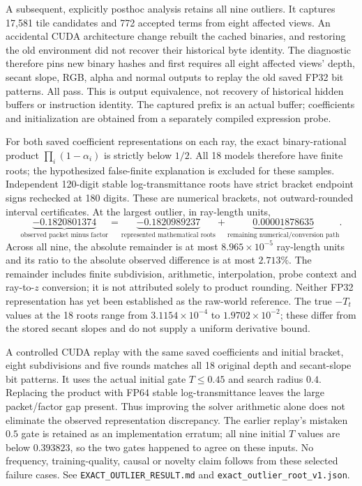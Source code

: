 \documentclass[11pt,a4paper]{article}
\begin{document}
A subsequent, explicitly posthoc analysis retains all nine outliers.
It captures 17,581 tile candidates and 772 accepted terms from eight
affected views. An accidental CUDA architecture change rebuilt the
cached binaries, and restoring the old environment did not recover
their historical byte identity. The diagnostic therefore pins new
binary hashes and first requires all eight affected views' depth,
secant slope, RGB, alpha and normal outputs to replay the old saved
FP32 bit patterns. All pass. This is output equivalence, not recovery
of historical hidden buffers or instruction identity. The captured
prefix is an actual buffer; coefficients and initialization are
obtained from a separately compiled expression probe.

For both saved coefficient representations on each ray, the exact
binary-rational product $\prod_i(1-\alpha_i)$ is strictly below
$1/2$. All 18 models therefore have finite roots; the hypothesized
false-finite explanation is excluded for these samples. Independent
120-digit stable log-transmittance roots have strict bracket endpoint
signs rechecked at 180 digits. These are numerical brackets, not
outward-rounded interval certificates. At the largest outlier, in
ray-length units,
\[
 \underbrace{-0.1820801374}_{\text{observed packet minus factor}}
 =\underbrace{-0.1820989237}_{\text{represented mathematical roots}}
  +\underbrace{0.00001878635}_{\text{remaining numerical/conversion path}}.
\]
Across all nine, the absolute remainder is at most
$8.965\times10^{-5}$ ray-length units and its ratio to the absolute
observed difference is at most $2.713\%$. The remainder includes
finite subdivision, arithmetic, interpolation, probe context and
ray-to-$z$ conversion; it is not attributed solely to product rounding.
Neither FP32 representation has yet been established as the raw-world
reference. The true $-T_t$ values at the 18 roots range from
$3.1154\times10^{-4}$ to $1.9702\times10^{-2}$; these differ from
the stored secant slopes and do not supply a uniform derivative bound.

A controlled CUDA replay with the same saved coefficients and initial
bracket, eight subdivisions and five rounds matches all 18 original
depth and secant-slope bit patterns. It uses the actual initial gate
$T\leq0.45$ and search radius $0.4$. Replacing the product with FP64
stable log-transmittance leaves the large packet/factor gap present.
Thus improving the solver arithmetic alone does not eliminate the
observed representation discrepancy. The earlier replay's mistaken
$0.5$ gate is retained as an implementation erratum; all nine initial
$T$ values are below $0.393823$, so the two gates happened to agree
on these inputs. No frequency, training-quality, causal or novelty
claim follows from these selected failure cases.
See \texttt{EXACT\_OUTLIER\_RESULT.md} and
\texttt{exact\_outlier\_root\_v1.json}.
\end{document}
